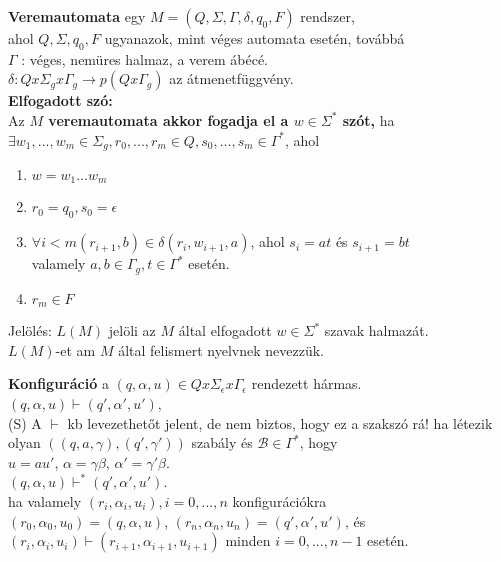 \documentclass{beamer}
\newcommand{\mmedskip}{\vspace{0.5em}}
\newcommand{\mbigskip}{\vspace{1em}}
\begin{document}
\begin{frame}
\begin{tcolorbox}[title={Def.: Veremautomata, Elfgadott szó}]
\textbf{Veremautomata} egy $M = (Q, {\Sigma}, {\Gamma}, {\delta}, q_0, F)$ rendszer,\\
ahol $Q, {\Sigma}, q_0, F$ ugyanazok, mint véges automata esetén, továbbá\\
\mmedskip
$\Gamma$ : véges, nemüres halmaz, a verem ábécé.\\
$\delta : Q x {\Sigma}_g x {\Gamma}_g \rightarrow p(Q x {\Gamma}_g)$ az átmenetfüggvény.\\
\mbigskip
\textbf{Elfogadott szó:}\\
Az \textbf{$M$ veremautomata akkor fogadja el a $w \in {\Sigma}^*$ szót,} ha\\
${\exists}w_1, ..., w_m \in {\Sigma}_g, r_0, ..., r_m \in Q, s_0, ..., s_m \in {\Gamma}^*$, ahol\\
\begin{enumerate}
\item $w = w_1...w_m$\\
\item $r_0 = q_0, s_0 = \epsilon$
\item ${\forall}i < m (r_{i + 1}, b) \in {\delta}(r_i, w_{i + 1}, a)$, ahol $s_i = at$ és $s_{i + 1} = bt$\\
valamely $a, b \in {\Gamma}_g, t \in {\Gamma}^*$ esetén.
\item $r_m \in F$
\end{enumerate}
\mmedskip
Jelölés: $L(M)$ jelöli az $M$ által elfogadott $w \in {\Sigma}^*$ szavak halmazát.\\
$L(M)$-et am $M$ által felismert nyelvnek nevezzük.
\end{tcolorbox}
\end{frame}

\begin{frame}
\begin{tcolorbox}[title={Def.: Konfiguráció}]
\textbf{Konfiguráció} a $(q, {\alpha}, u) \in Q x {\Sigma}_{\epsilon} x {\Gamma}_{\epsilon}$ rendezett hármas.\\
\mmedskip
$(q, {\alpha}, u) \vdash (q', {\alpha}', u')$,\\
{\tiny (S) A $\vdash$ kb levezethetőt jelent, de nem biztos, hogy ez a szakszó rá!}
\mmedskip
ha létezik olyan $((q, a, {\gamma}), (q', {\gamma}'))$ szabály és $\mathcal{B} \in {\Gamma}^*$, hogy\\
\mmedskip
$u = au'$, $\alpha = {\gamma}{\beta}$, ${\alpha}' = {\gamma}'{\beta}$.\\
\mmedskip
$(q, {\alpha}, u) {\vdash}^* (q', {\alpha}', u')$.\\
\mmedskip
ha valamely $(r_i, {\alpha}_i, u_i), i = 0, ..., n$ konfigurációkra\\
\mmedskip
$(r_0, {\alpha}_0, u_0) = (q, {\alpha}, u)$, $(r_n, {\alpha}_n, u_n) = (q', {\alpha}', u')$, és\\
$(r_i, {\alpha}_i, u_i) \vdash (r_{i + 1}, {\alpha}_{i + 1}, u_{i + 1})$ minden $i = 0, ..., n - 1$ esetén.\\
\end{tcolorbox}
\end{frame}
\end{document}
